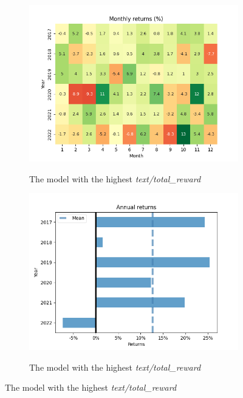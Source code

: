 \documentclass[../xlapes02]{subfiles}
\begin{document}
    \begin{figure}
        \centering

        \begin{subfigure}[t]{\experimentimgwidth\textwidth}
            \centering
            \includegraphics[width=\linewidth]{image/figure/monthly_returns_heatmap_max}
            \label{subfig:montly_returns_heatmap_max}
            \caption{The model with the highest \emph{text/total\_reward}}
        \end{subfigure}
        \hfill
        \begin{subfigure}[t]{\experimentimgwidth\textwidth}
            \centering
            \includegraphics[width=\linewidth]{image/figure/annual_returns_max}
            \label{subfig:annual_returns_max}
            \caption{The model with the highest \emph{text/total\_reward}}
        \end{subfigure}


\end{figure}
\end{document}
